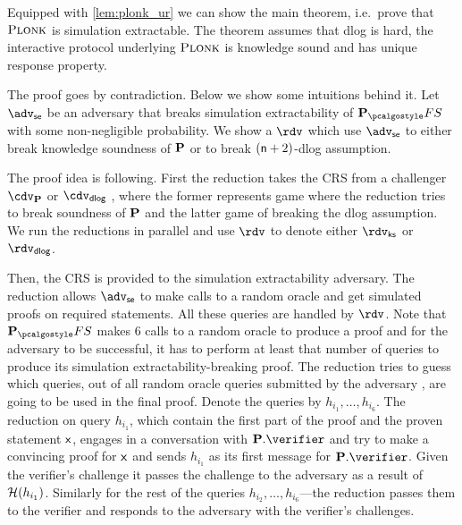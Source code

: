 \documentclass[runningheads,11pt]{llncs}
\theoremstyle{definition}
\begin{document}
Equipped with \cref{lem:plonk_ur} we can show the main theorem, i.e.~prove that $\textsc{Plonk}$ is simulation extractable. The theorem assumes that dlog is hard, the interactive protocol underlying $\textsc{Plonk}$ is knowledge sound and has unique response property.

The proof goes by contradiction. Below we show some intuitions behind it.
Let $\advse$ be an adversary that breaks simulation extractability of $\plonkprotfs$ with some non-negligible probability. 
We show a $\rdv$ which use $\advse$ to either break knowledge soundness of $\mathbf{P}$ or to break $(\mathsf{n} + 2)$-dlog assumption.

The proof idea is following. First the reduction takes the CRS from a challenger
$\cdv_\plonkprot$ or $\cdv_\dlog$ 
	, where the former represents game where the reduction tries to break soundness of $\mathbf{P}$ and the latter game of breaking the dlog assumption. We run the reductions in parallel and use $\rdv$ to denote either $\rdvks$ or $\rdvdlog$.

Then, the CRS is provided to the simulation extractability adversary. The reduction allows $\advse$ to make calls to a random oracle and get simulated proofs on required statements. All these queries are handled by $\rdv$.
Note that $\plonkprotfs$ makes $6$ calls to a random oracle to produce a proof
and for the adversary to be successful, it has to perform at least that number
of queries to produce its simulation extractability-breaking
proof.
	 The reduction tries to guess which queries,
out of all random oracle queries submitted by the adversary
, are going to be used in the final proof. Denote the queries by $h_{i_1}, \ldots, h_{i_6}$. 
The reduction on query $h_{i_1}$, which contain the first part of the proof and the proven statement $\mathsf{x}$, engages in a conversation with $\plonkprot.\verifier$ and try to make a convincing proof for $\mathsf{x}$ and sends $h_{i_1}$ as its first message for $\plonkprot.\verifier$. Given the verifier's challenge it passes the challenge to the adversary as a result of $\mathcal{H}(h_{i_1})$. 
Similarly for the rest of the queries $h_{i_2}, \ldots, h_{i_6}$---the reduction passes them to the verifier and responds to the adversary with the verifier's challenges.
\end{document}
